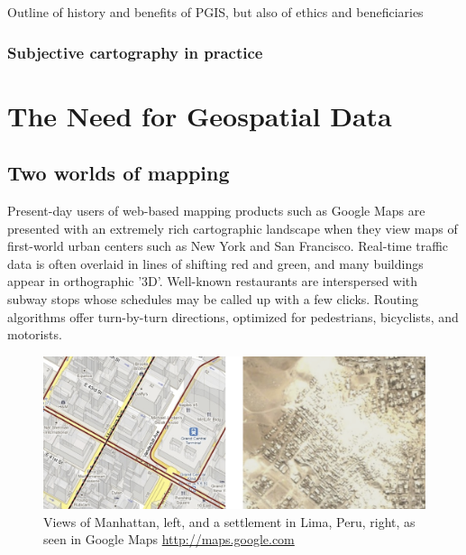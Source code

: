 \documentclass[11pt]{report}
\begin{document}


Outline of history and benefits of PGIS, but also of ethics and beneficiaries

\subsection{Subjective cartography in practice}

\chapter{The Need for Geospatial Data}
\section{Two worlds of mapping}

Present-day users of web-based mapping products such as Google Maps are presented with an extremely rich cartographic landscape when they view maps of first-world urban centers such as New York and San Francisco. Real-time traffic data is often overlaid in lines of shifting red and green, and many buildings appear in orthographic '3D'. Well-known restaurants are interspersed with subway stops whose schedules may be called up with a few clicks. Routing algorithms offer turn-by-turn directions, optimized for pedestrians, bicyclists, and motorists. 

\begin{figure}[h]
	\begin{center}
		\includegraphics[width=1\textwidth]{images/two-worlds-mapping.png}
		Views of Manhattan, left, and a settlement in Lima, Peru, right, as seen in Google Maps \url{http://maps.google.com}
	\end{center}
\end{figure}
\end{document}

